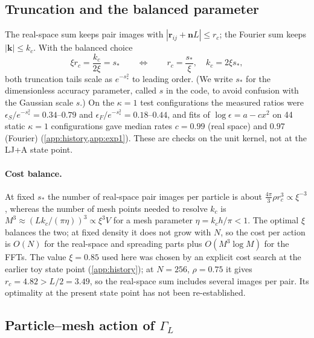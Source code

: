 \documentclass[11pt]{article}
\DeclareRobustCommand{\_}{\textunderscore\allowbreak}
\theoremstyle{remark}
\theoremstyle{definition}
\newcommand{\br}{\mathbf{r}}
\newcommand{\bk}{\mathbf{k}}
\newcommand{\bn}{\mathbf{n}}
\begin{document}
\subsection{Truncation and the balanced parameter}

The real-space sum keeps pair images with $|\br_{ij}+\bn L|\le r_c$; the Fourier sum keeps $|\bk|\le k_c$. With
the balanced choice
\begin{equation}\label{eq:balance}
\xi r_c=\frac{k_c}{2\xi}=s_\ast\qquad\Longleftrightarrow\qquad r_c=\frac{s_\ast}{\xi},\quad k_c=2\xi s_\ast,
\end{equation}
both truncation tails scale as $e^{-s_\ast^2}$ to leading order. (We write $s_\ast$ for the dimensionless accuracy
parameter, called $s$ in the code, to avoid confusion with the Gaussian scale $s$.) On the $\kappa=1$ test
configurations the measured ratios were $\epsilon_S/e^{-s_\ast^2}=0.34$--$0.79$ and $\epsilon_F/e^{-s_\ast^2}=0.18$--$0.44$,
and fits of $\log\epsilon=a-cx^2$ on 44 static $\kappa=1$ configurations gave median rates $c=0.99$ (real space) and $0.97$
(Fourier) (\cref{app:history,app:exp1}). These are checks on the unit kernel, not at the LJ+A state point.

\paragraph{Cost balance.}
At fixed $s_\ast$ the number of real-space pair images per particle is about $\frac{4\pi}{3}\rho r_c^3\propto\xi^{-3}$,
whereas the number of mesh points needed to resolve $k_c$ is $M^3\approx(Lk_c/(\pi\eta))^3\propto\xi^3V$ for a mesh
parameter $\eta=k_ch/\pi<1$. The optimal $\xi$ balances the two; at fixed density it does not grow with $N$, so the
cost per action is $O(N)$ for the real-space and spreading parts plus $O(M^3\log M)$ for the FFTs. The value
$\xi=0.85$ used here was chosen by an explicit cost search at the earlier toy state point (\cref{app:history}); at
$N=256$, $\rho=0.75$ it gives $r_c=4.82>L/2=3.49$, so the real-space sum includes several images per pair. Its
optimality at the present state point has not been re-established.

\subsection{Particle--mesh action of \texorpdfstring{$\Gamma_L$}{Gamma\_L}}\label{sec:pppm}
\end{document}
